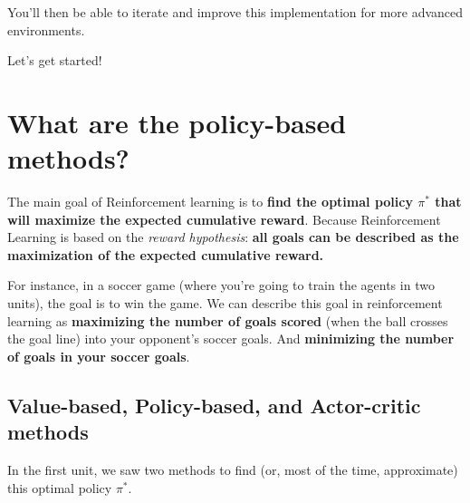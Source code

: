 \documentclass[11pt,a4paper]{article}
\begin{document}
You'll then be able to iterate and improve this implementation for more advanced environments.


Let's get started!

\section{What are the policy-based methods?}\label{what-are-the-policy-based-methods}

The main goal of Reinforcement learning is to \textbf{find the optimal policy \(\pi^{*}\) that will maximize the expected cumulative reward}. Because Reinforcement Learning is based on the \emph{reward hypothesis}: \textbf{all goals can be described as the maximization of the expected cumulative reward.}

For instance, in a soccer game (where you're going to train the agents in two units), the goal is to win the game. We can describe this goal in reinforcement learning as \textbf{maximizing the number of goals scored} (when the ball crosses the goal line) into your opponent's soccer goals. And \textbf{minimizing the number of goals in your soccer goals}.


\subsection{Value-based, Policy-based, and Actor-critic methods}\label{value-based-policy-based-and-actor-critic-methods}

In the first unit, we saw two methods to find (or, most of the time, approximate) this optimal policy \(\pi^{*}\).
\end{document}
